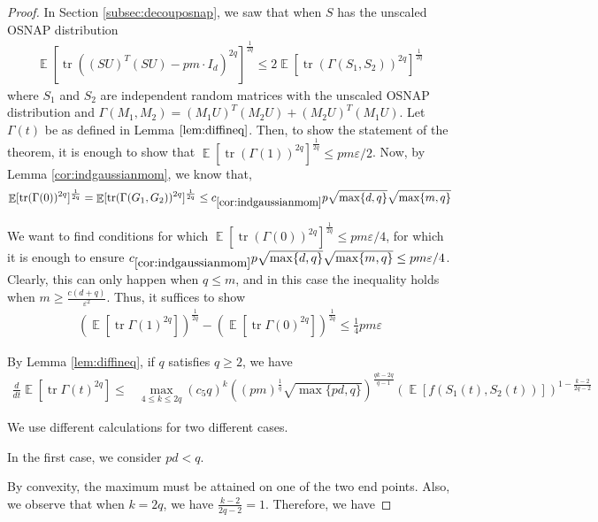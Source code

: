 \documentclass[11pt]{amsart}
\numberwithin{equation}{section}
\numberwithin{equation}{section}
\DeclareMathOperator{\E}{\mathbb{E}}
\DeclareMathOperator*{\tr}{tr}
\theoremstyle{remark}
\theoremstyle{definition}
\begin{document}
\begin{proof}

In Section \ref{subsec:decouposnap}, we saw that when $S$ has the unscaled OSNAP distribution \begin{align*}\E[\tr((SU)^T(SU)-pm\cdot I_d)^{2q}]^\frac{1}{2q} \le 2 \E[\tr(\Gamma(S_1,S_2))^{2q}]^\frac{1}{2q}\end{align*} where $S_1$ and $S_2$ are independent random matrices with the unscaled OSNAP distribution and $\Gamma(M_1,M_2)=(M_1U)^T(M_2U)+(M_2U)^T(M_1U)$. Let $\Gamma(t)$ be as defined in Lemma $\ref{lem:diffineq}$. Then, to show the statement of the theorem, it is enough to show that $\E[\tr(\Gamma(1))^{2q}]^\frac{1}{2q} \le pm\varepsilon/2$. Now, by Lemma \ref{cor:indgaussianmom}, we know that, $$\E[\tr(\Gamma(0))^{2q}]^\frac{1}{2q} = \E[\tr(\Gamma(G_1, G_2))^{2q}]^\frac{1}{2q} \le c_{\ref*{cor:indgaussianmom}}p\sqrt{\max\{d, q\}}\sqrt{\max\{m, q\}}$$ 

We want to find conditions for which $\E[\tr(\Gamma(0))^{2q}]^\frac{1}{2q} \le pm\varepsilon/4$, for which it is enough to ensure $c_{\ref*{cor:indgaussianmom}}p\sqrt{\max\{d, q\}}\sqrt{\max\{m, q\}} \le pm\varepsilon/4$. Clearly, this can only happen when $q \le m$, and in this case the inequality holds when $m \ge \frac{c(d+q)}{\varepsilon^2}$. Thus, it suffices to show
\begin{align*}
    (\E[\tr \Gamma(1)^{2q}])^{\frac{1}{2q}}-(\E[\tr \Gamma(0)^{2q}])^{\frac{1}{2q}} \le \frac{1}{4} pm \varepsilon
\end{align*}


By Lemma \ref{lem:diffineq}, if $q$ satisfies $q \ge 2$, we have
\begin{align*}
\frac{d}{dt} \E[\tr \Gamma(t)^{2q}] \le & \max \limits_{4 \le k \le 2q} (c_5q)^k ((pm)^{\frac{1}{q}}\sqrt{\max\{pd,q\}})^{\frac{qk-2q}{q-1}}(\E[f(S_1(t),S_2(t))])^{1-\frac{k-2}{2q-2}}
\end{align*}




We use different calculations for two different cases.

In the first case, we consider $pd<q$.

By convexity, the maximum must be attained on one of the two end points. Also, we observe that when $k=2q$, we have $\frac{k-2}{2q-2}=1$. Therefore, we have



\end{proof}
\end{document}
